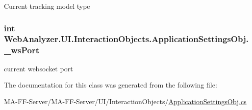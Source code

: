 Current tracking model type 

\hypertarget{class_web_analyzer_1_1_u_i_1_1_interaction_objects_1_1_application_settings_obj_aa8f8de8781d5d9fb22fa8b1d35ccf731}{}
\subsubsection[{\+\_\+ws\+Port}]{\setlength{\rightskip}{0pt plus 5cm}int Web\+Analyzer.\+U\+I.\+Interaction\+Objects.\+Application\+Settings\+Obj.\+\_\+ws\+Port\hspace{0.3cm}{\ttfamily [private]}}\label{class_web_analyzer_1_1_u_i_1_1_interaction_objects_1_1_application_settings_obj_aa8f8de8781d5d9fb22fa8b1d35ccf731}


current websocket port 



The documentation for this class was generated from the following file\+:\begin{DoxyCompactItemize}
\item 
M\+A-\/\+F\+F-\/\+Server/\+M\+A-\/\+F\+F-\/\+Server/\+U\+I/\+Interaction\+Objects/\hyperlink{_application_settings_obj_8cs}{Application\+Settings\+Obj.\+cs}\end{DoxyCompactItemize}
